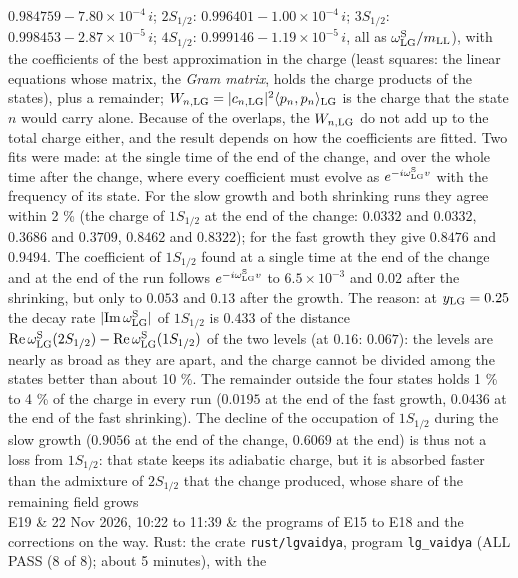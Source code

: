 \documentclass[
  10pt,
]{article}
\begin{document}
\begin{longtable}[]
\(0.984759-7.80\times10^{-4}\,i\); \(2S_{1/2}\):
\(0.996401-1.00\times10^{-4}\,i\); \(3S_{1/2}\):
\(0.998453-2.87\times10^{-5}\,i\); \(4S_{1/2}\):
\(0.999146-1.19\times10^{-5}\,i\), all as
\(\omega^{\rm S}_{\rm LG}/m_{\rm LL}\)), with the coefficients of the
best approximation in the charge (least squares: the linear equations
whose matrix, the \emph{Gram matrix}, holds the charge products of the
states), plus a remainder;
\(W_{n,{\rm LG}}=\lvert c_{n,{\rm LG}}\rvert^2\langle p_n,p_n\rangle_{\rm LG}\)
is the charge that the state \(n\) would carry alone. Because of the
overlaps, the \(W_{n,{\rm LG}}\) do not add up to the total charge
either, and the result depends on how the coefficients are fitted. Two
fits were made: at the single time of the end of the change, and over
the whole time after the change, where every coefficient must evolve as
\(e^{-i\omega^{\rm S}_{\rm LG}v}\) with the frequency of its state. For
the slow growth and both shrinking runs they agree within 2 \% (the
charge of \(1S_{1/2}\) at the end of the change: \(0.0332\) and
\(0.0332\), \(0.3686\) and \(0.3709\), \(0.8462\) and \(0.8322\)); for
the fast growth they give \(0.8476\) and \(0.9494\). The coefficient of
\(1S_{1/2}\) found at a single time at the end of the change and at the
end of the run follows \(e^{-i\omega^{\rm S}_{\rm LG}v}\) to
\(6.5\times10^{-3}\) and \(0.02\) after the shrinking, but only to
\(0.053\) and \(0.13\) after the growth. The reason: at
\(y_{\rm LG}=0.25\) the decay rate
\(\lvert{\rm Im}\,\omega^{\rm S}_{\rm LG}\rvert\) of \(1S_{1/2}\) is
\(0.433\) of the distance
\({\rm Re}\,\omega^{\rm S}_{\rm LG}(2S_{1/2})-{\rm Re}\,\omega^{\rm S}_{\rm LG}(1S_{1/2})\)
of the two levels (at \(0.16\): \(0.067\)): the levels are nearly as
broad as they are apart, and the charge cannot be divided among the
states better than about 10 \%. The remainder outside the four states
holds 1 \% to 4 \% of the charge in every run (\(0.0195\) at the end of
the fast growth, \(0.0436\) at the end of the fast shrinking). The
decline of the occupation of \(1S_{1/2}\) during the slow growth
(\(0.9056\) at the end of the change, \(0.6069\) at the end) is thus not
a loss from \(1S_{1/2}\): that state keeps its adiabatic charge, but it
is absorbed faster than the admixture of \(2S_{1/2}\) that the change
produced, whose share of the remaining field grows \\
E19 & 22 Nov 2026, 10:22 to 11:39 & the programs of E15 to E18 and the
corrections on the way. Rust: the crate \texttt{rust/lgvaidya}, program
\texttt{lg\_vaidya} (ALL PASS (8 of 8); about 5 minutes), with the

\end{longtable}
\end{document}
